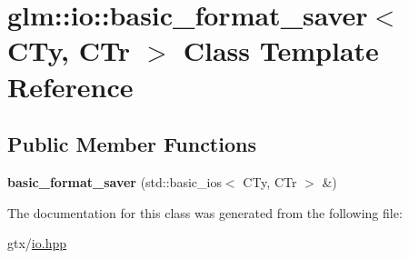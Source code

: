 \hypertarget{classglm_1_1io_1_1basic__format__saver}{\section{glm\-:\-:io\-:\-:basic\-\_\-format\-\_\-saver$<$ C\-Ty, C\-Tr $>$ Class Template Reference}
\label{classglm_1_1io_1_1basic__format__saver}
}
\subsection*{Public Member Functions}
\begin{DoxyCompactItemize}
\item 
\hypertarget{classglm_1_1io_1_1basic__format__saver_a268ddf9ea158d6764978066269d42538}{{\bfseries basic\-\_\-format\-\_\-saver} (std\-::basic\-\_\-ios$<$ C\-Ty, C\-Tr $>$ \&)}\label{classglm_1_1io_1_1basic__format__saver_a268ddf9ea158d6764978066269d42538}

\end{DoxyCompactItemize}


The documentation for this class was generated from the following file\-:\begin{DoxyCompactItemize}
\item 
gtx/\hyperlink{io_8hpp}{io.\-hpp}\end{DoxyCompactItemize}
